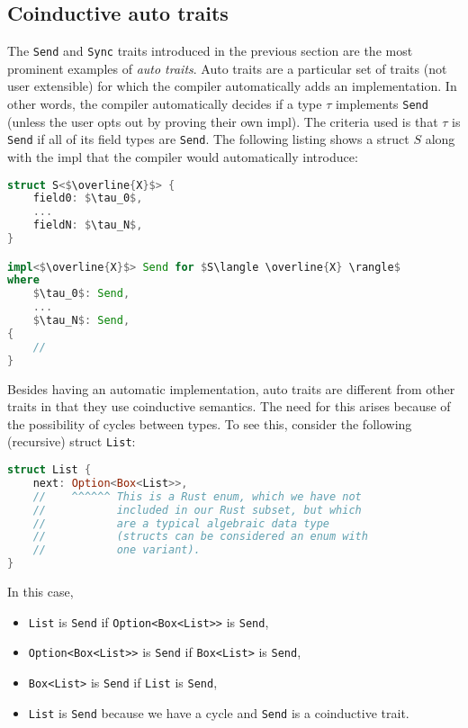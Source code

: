 \documentclass[sn-mathphys-num]{sn-jnl}%
\newcommand{\code}[1]{{\tt #1}}
\theoremstyle{thmstyleone}%
\theoremstyle{thmstyletwo}%
\theoremstyle{thmstylethree}%
\begin{document}
\subsection{Coinductive auto traits}

The \code{Send} and \code{Sync} traits introduced in the previous section
are the most prominent examples of \emph{auto traits}.
Auto traits are a particular set of traits (not user extensible)
for which the compiler automatically adds an implementation.
In other words, the compiler automatically decides if a type $\tau$ implements \code{Send}
(unless the user opts out by proving their own impl).
The criteria used is that $\tau$ is \code{Send} if all of its field types are \code{Send}.
The following listing shows a struct $S$ along with the impl that the compiler would automatically introduce:

\begin{lstlisting}[language=Rust]
struct S<$\overline{X}$> {
    field0: $\tau_0$,
    ...
    fieldN: $\tau_N$,
}

impl<$\overline{X}$> Send for $S\langle \overline{X} \rangle$
where
    $\tau_0$: Send,
    ...
    $\tau_N$: Send,
{
    // 
}
\end{lstlisting}

Besides having an automatic implementation, auto traits are different from other traits in that they use coinductive semantics.
The need for this arises because of the possibility of cycles between types.
To see this, consider the following (recursive) struct \code{List}:

\begin{lstlisting}[language=Rust]
struct List {
    next: Option<Box<List>>,
    //    ^^^^^^ This is a Rust enum, which we have not
    //           included in our Rust subset, but which
    //           are a typical algebraic data type
    //           (structs can be considered an enum with
    //           one variant).
}    
\end{lstlisting}

In this case,

\begin{itemize}
    \item \code{List} is \code{Send} if \code{Option<Box<List>>} is \code{Send},
    \item \code{Option<Box<List>>} is \code{Send} if \code{Box<List>} is \code{Send},
    \item \code{Box<List>} is \code{Send} if \code{List} is \code{Send},
    \item \code{List} is \code{Send} because we have a cycle and \code{Send} is a coinductive trait.
\end{itemize}
\end{document}
